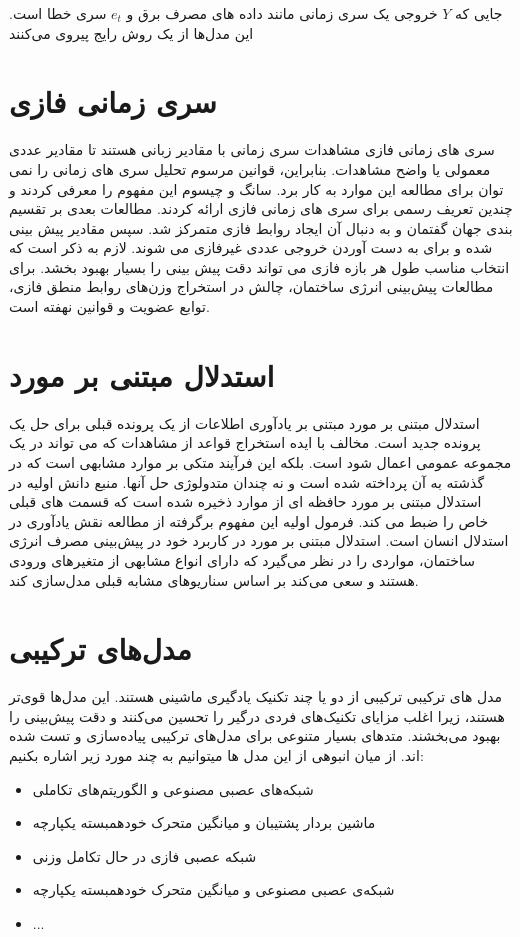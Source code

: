     جایی که $Y$ خروجی یک سری زمانی مانند داده های مصرف برق و $e_t$ سری خطا است. این مدل‌ها از یک روش رایج پیروی می‌کنند
\section{سری زمانی فازی}
سری های زمانی فازی مشاهدات سری زمانی با مقادیر زبانی هستند تا مقادیر عددی معمولی یا واضح مشاهدات.
 بنابراین، قوانین مرسوم تحلیل سری های زمانی را نمی توان برای مطالعه این موارد به کار برد. سانگ و چیسوم \cite{song1993fuzzy} این مفهوم را معرفی کردند و چندین تعریف رسمی برای سری های زمانی فازی ارائه کردند. 
 مطالعات بعدی بر تقسیم بندی جهان گفتمان و به دنبال آن ایجاد روابط فازی متمرکز شد. سپس مقادیر پیش بینی شده و برای به دست آوردن خروجی عددی غیرفازی می شوند. 
 لازم به ذکر است که انتخاب مناسب طول هر بازه فازی می تواند دقت پیش بینی را بسیار بهبود بخشد.
  برای مطالعات پیش‌بینی انرژی ساختمان، چالش در استخراج وزن‌های روابط منطق فازی، توابع عضویت و قوانین نهفته است.

\section[استدلال مبتنی بر مورد]{استدلال مبتنی بر مورد\protect{}}
استدلال مبتنی بر مورد مبتنی بر یادآوری اطلاعات از یک پرونده قبلی برای حل یک پرونده جدید است. مخالف با ایده استخراج قواعد از مشاهدات که می تواند در یک مجموعه عمومی اعمال شود است.
 بلکه این فرآیند متکی بر موارد مشابهی است 
 که در گذشته به آن پرداخته شده است و نه چندان متدولوژی حل آنها.
  منبع دانش اولیه در استدلال مبتنی بر مورد حافظه ای از موارد ذخیره شده است که قسمت های قبلی خاص را ضبط می کند\cite{leake1996cbr}. 
 فرمول اولیه این مفهوم برگرفته از مطالعه نقش یادآوری در استدلال انسان است\cite{schank1983dynamic}. 
 استدلال مبتنی بر مورد در کاربرد خود در پیش‌بینی مصرف انرژی ساختمان، مواردی را در نظر می‌گیرد که دارای انواع مشابهی از متغیرهای ورودی هستند
  و سعی می‌کند بر اساس سناریوهای مشابه قبلی مدل‌سازی کند.

\section[مدل‌های ترکیبی]{مدل‌های ترکیبی‌\protect{}}
مدل های ترکیبی ترکیبی از دو یا چند تکنیک یادگیری ماشینی هستند. این مدل‌ها قوی‌تر هستند، 
زیرا اغلب مزایای تکنیک‌های فردی درگیر را تحسین می‌کنند و دقت پیش‌بینی را بهبود می‌بخشند.
متد‌های بسیار متنوعی برای مدل‌های ترکیبی پیاده‌سازی و تست شده اند. از میان انبوهی از این مدل ها میتوانیم به چند مورد زیر اشاره بکنیم:
\begin{itemize}
    \item شبکه‌های عصبی مصنوعی و الگوریتم‌های تکاملی\cite{azadeh2007integration}
    \item ماشین بردار پشتیبان و میانگین متحرک خودهمبسته یکپارچه\cite{nie2012hybrid}
    \item شبکه عصبی فازی در حال تکامل وزنی \cite{chang2011monthly}
    \item شبکه‌ی عصبی مصنوعی و میانگین متحرک خودهمبسته یکپارچه\cite{wang2014techniques}
    \item ...
\end{itemize}

